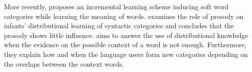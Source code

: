 More recently, \cite{alishahi2012concurrent} proposes an incremental learning
scheme inducing soft word categories while learning the meaning of words. 
\cite{thothathiri2012effect} examines the role of prosody on infants' distributional learning of
syntactic categories and concludes that the prosody shows little influence. \cite{reeder2013shared} aims to answer the use of distributional knowledge when the evidence on  the possible context of a word is not enough. Furthermore,
they explain how and when the language users form new categories depending on
the overlaps between the context words.
